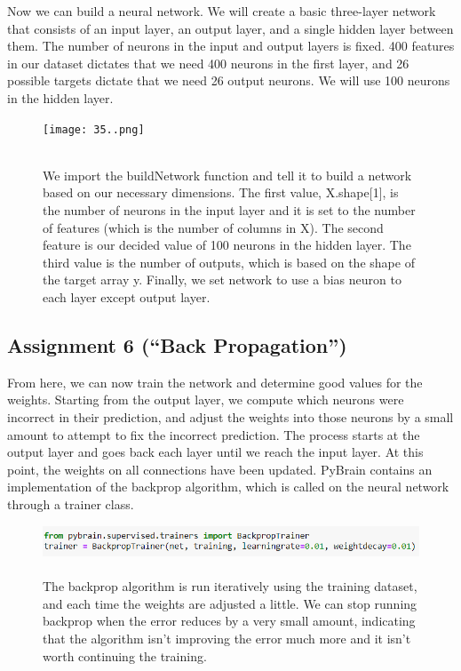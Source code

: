 \documentclass[onecolumn]{article}
\begin{document}
\begin{t}
Now we can build a neural network. We will create a basic three-layer network that
consists of an input layer, an output layer, and a single hidden layer between them.
The number of neurons in the input and output layers is fixed. 400 features in our
dataset dictates that we need 400 neurons in the first layer, and 26 possible targets
dictate that we need 26 output neurons. We will use 100 neurons in the hidden layer.
\end{t}

\newpage
\begin{figure}[hb!]
    \centering
    \texttt{[image: 35..png]}
\caption{\label{fig:demo-bad}
\centering
\\We import the buildNetwork function and tell it to build a network based on our
necessary dimensions. The first value, X.shape[1], is the number of neurons in the
input layer and it is set to the number of features (which is the number of columns in
X). The second feature is our decided value of 100 neurons in the hidden layer. The
third value is the number of outputs, which is based on the shape of the target array
y. Finally, we set network to use a bias neuron to each layer except  output
layer.}
\end{figure}

\subsection{Assignment 6 (``Back Propagation'')}

\begin{t}
From here, we can now train the network and determine good values for the weights. Starting from the output layer, we compute which neurons were incorrect in their prediction, and adjust the weights into those neurons by a small amount to attempt to fix the incorrect prediction. The process starts at the output layer and goes back each layer until we reach the input layer. At this point, the weights on all connections have been updated. PyBrain contains an implementation of the backprop algorithm, which is called on the neural network through a trainer class.
\end{t}

\begin{figure}[h]
    \centering
    \includegraphics[width=.9\linewidth]{36..png}
\caption{\label{fig:demo-bad}
\centering
\\The backprop algorithm is run iteratively using the training dataset, and each time
the weights are adjusted a little. We can stop running backprop when the error
reduces by a very small amount, indicating that the algorithm isn't improving the
error much more and it isn't worth continuing the training.}
\end{figure}
\end{document}
